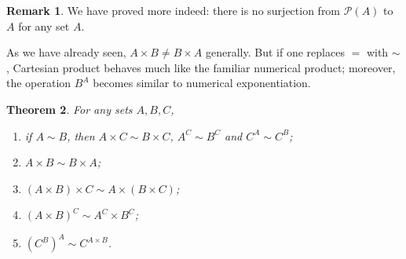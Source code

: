\documentclass[12pt,notitlepage]{article}
\theoremstyle{plain}
\newtheorem{thm}{Theorem}[section]
\theoremstyle{definition}
\newtheorem{rem}[thm]{Remark}
\theoremstyle{plain}
\newcommand{\mP}{\mathcal{P}}
\newcommand{\1}{\mathbf{1}}
\newcommand{\0}{\mathbf{0}}
\newcommand{\mcomm}[1]{}
\begin{document}
\begin{rem}
We have proved more indeed: there is no surjection from $\mP(A)$ to $A$ for any set $A$.
\end{rem}

As we have already seen, $A \times B \neq B \times A$ generally. But if one replaces ${=}$ with ${\sim}$, Cartesian product behaves much like the familiar numerical product; moreover, the operation $B^A$ becomes similar to numerical exponentiation.

\mcomm{The following theorem can spare a lot of effort when proving set equivalence as Example~\ref{eq_sets:big_exm} shows. So, it is recommended to highlight this result and make the students remember its statement. It depends on the audience whether it is worth a detailed proof.}
\begin{thm}\label{ch0:bi_power}
For any sets $A, B, C$,
\begin{enumerate}
\item if $A \sim B$, then $A \times C \sim B \times C$, $A^C \sim B^C$ and $C^A \sim C^B$;
\item $A \times B \sim B \times A$;
\item $(A \times B) \times C \sim A \times (B \times C)$;
\item $(A\times B)^C \sim A^C \times B^C$;
\item $(C^B)^A \sim C^{A \times B}$.
\end{enumerate}
\end{thm}
\end{document}
